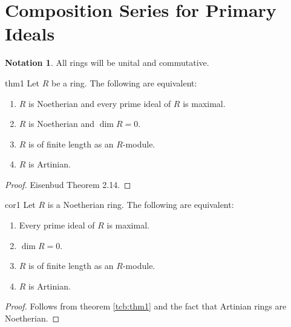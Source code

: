 \documentclass[a4paper,10pt]{article}
\makeatletter
\theoremstyle{definition}
\newtheorem{notation}[tcb@cnt@theorem]{Notation}
\newcommand\tref[2][blue!60!black]{theorem \ref{tcb:#2}}
\makeatother
\begin{document}
\def\numberline#1{}
\hypertarget{toc}{}
\tableofcontents
\pagebreak

\section{Composition Series for Primary Ideals}
\begin{notation}
All rings will be unital and commutative.
\end{notation}

\begin{theorem}{}{thm1}
Let $R$ be a ring. 
The following are equivalent:
\begin{enumerate}[label=(\arabic*)]
\item 
$R$ is Noetherian and every prime ideal of $R$ is maximal.
\item
$R$ is Noetherian and $\dim R=0$.
\item
$R$ is of finite length as an $R$-module.
\item 
$R$ is Artinian.
\end{enumerate}
\end{theorem}
\begin{proof}
Eisenbud Theorem 2.14.
\end{proof}

\begin{corollary}{}{cor1}
Let $R$ is a Noetherian ring.
The following are equivalent:
\begin{enumerate}[label=(\arabic*)]
\item 
Every prime ideal of $R$ is maximal.
\item
$\dim R=0$.
\item
$R$ is of finite length as an $R$-module.
\item 
$R$ is Artinian.
\end{enumerate}
\end{corollary}
\begin{proof}
Follows from \tref{thm1} and the fact that Artinian rings are Noetherian.
\end{proof}
\end{document}
